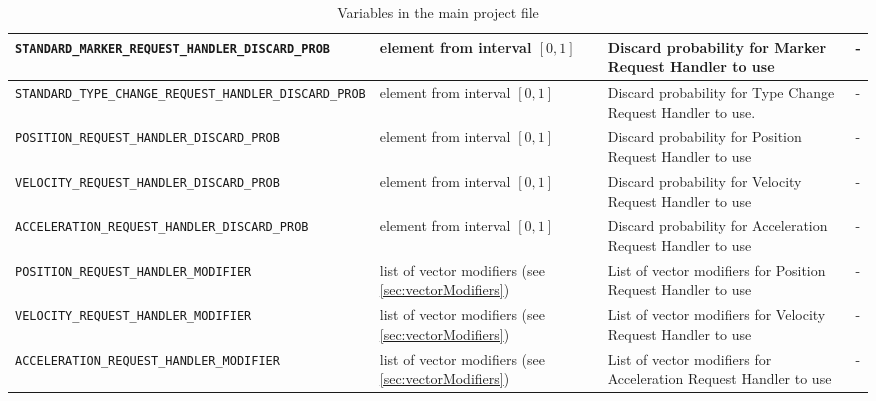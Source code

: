 \begin{sidewaystable}
\begin{tabular}{|l|p{}|p{}|p{}|}
		
		
		 \texttt{STANDARD\_MARKER\_REQUEST\_HANDLER\_DISCARD\_PROB} &  element from interval $[0,1]$ & Discard probability for Marker Request Handler to use & -\\\hline
		 
		\texttt{STANDARD\_TYPE\_CHANGE\_REQUEST\_HANDLER\_DISCARD\_PROB} & element from interval $[0,1]$ & Discard probability  for Type Change Request Handler to use. & -\\\hline
		
		\texttt{POSITION\_REQUEST\_HANDLER\_DISCARD\_PROB} & element from interval $[0,1]$ & Discard probability  for Position Request Handler to use & -\\\hline

		\texttt{VELOCITY\_REQUEST\_HANDLER\_DISCARD\_PROB} & element from interval $[0,1]$ & Discard probability  for Velocity Request Handler to use & -\\\hline

		\texttt{ACCELERATION\_REQUEST\_HANDLER\_DISCARD\_PROB} & element from interval $[0,1]$ & Discard probability  for Acceleration Request Handler to use & -\\\hline
		
		
		\texttt{POSITION\_REQUEST\_HANDLER\_MODIFIER} & list of vector modifiers (see \ref{sec:vectorModifiers}) & List of vector modifiers for Position Request Handler to use & -\\\hline

		\texttt{VELOCITY\_REQUEST\_HANDLER\_MODIFIER} & list of vector modifiers (see \ref{sec:vectorModifiers}) & List of vector modifiers for Velocity Request Handler to use & -\\\hline

		\texttt{ACCELERATION\_REQUEST\_HANDLER\_MODIFIER} & list of vector modifiers (see \ref{sec:vectorModifiers}) & List of vector modifiers for Acceleration Request Handler to use & -\\\hline		
				
	\end{tabular}
	\caption{Variables in the main project file}\label{tab:mainvars2}
\end{sidewaystable}
\enlargethispage*{2cm}
\thispagestyle{empty}
\clearpage


